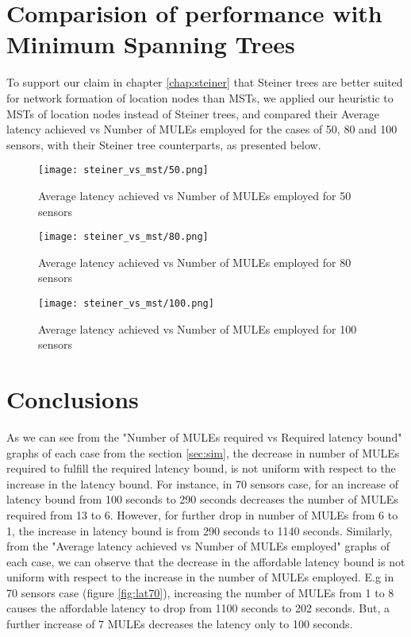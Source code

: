 \pagebreak

\section{Comparision of performance with Minimum Spanning Trees}
\label{compmst}

To support our claim in chapter \ref{chap:steiner} that Steiner trees are better suited for network formation of location nodes than MSTs, we applied our heuristic to MSTs of location nodes instead of Steiner trees, and compared their Average latency achieved vs Number of MULEs employed for the cases of 50, 80 and 100 sensors, with their Steiner tree counterparts, as presented below.

\begin{figure}[H]
\texttt{[image: steiner\_vs\_mst/50.png]}
\caption{Average latency achieved vs Number of MULEs employed for 50 sensors}
\end{figure}

\begin{figure}[H]
\texttt{[image: steiner\_vs\_mst/80.png]}
\caption{Average latency achieved vs Number of MULEs employed for 80 sensors}
\end{figure}

\begin{figure}[H]
\texttt{[image: steiner\_vs\_mst/100.png]}
\caption{Average latency achieved vs Number of MULEs employed for 100 sensors}
\end{figure}


\section{Conclusions}

As we can see from the "Number of MULEs required vs Required latency bound" graphs of each case from the section \ref{sec:sim}, the decrease in number of MULEs required to fulfill the required latency bound, is not uniform with respect to the increase in the latency bound. For instance, in 70 sensors case, for an increase of latency bound from 100 seconds to 290 seconds decreases the number of MULEs required from 13 to 6. However, for further drop in number of MULEs from 6 to 1, the increase in latency bound is from 290 seconds to 1140 seconds. Similarly, from the "Average latency achieved vs Number of MULEs employed" graphs of each case, we can observe that the decrease in the affordable latency bound is not uniform with respect to the increase in the number of MULEs employed. E.g in 70 sensors case (figure \ref{fig:lat70}), increasing the number of MULEs from 1 to 8 causes the affordable latency to drop from 1100 seconds to 202 seconds. But, a further increase of 7 MULEs decreases the latency only to 100 seconds. 

